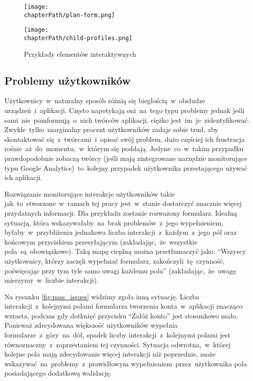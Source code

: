 \bigskip
\begin{figure}[H]
\centering
\begin{minipage}{.3\textwidth}
	\centering
	\texttt{[image: \\chapterPath/plan-form.png]}
\end{minipage}
\begin{minipage}{.4\textwidth}
	\centering
	\texttt{[image: \\chapterPath/child-profiles.png]}
\end{minipage}
\bigskip
\caption{Przykłady elementów interaktywnych}
\label{fig:interactive_areas}
\end{figure}

\subsection{Problemy użytkowników}
Użytkownicy~w~naturalny sposób różnią się biegłością~w~obsłudze urządzeń~i~aplikacji. Często napotykają oni~na~tego typu problemy jednak jeśli sami~nie~poinformują~o~nich twórców aplikacji, ciężko jest~im~je~zidentyfikować. Zwykle~tylko~marginalny procent użytkowników zadaje sobie trud, aby skontaktować się~z~twórcami~i~opisać swój problem, dużo częściej ich frustracja rośnie~aż~do~momentu,~w~którym się poddają. Jedyne~co~w~takim przypadku prawdopodobnie zobaczą twórcy (jeśli mają zintegrowane narzędzie monitorujące typu Google Analytics)~to~kolejny przypadek użytkownika przestającego używać ich aplikacji. 

Rozwiązanie monitorujące interakcje użytkowników takie jak~to~stworzone~w~ramach tej pracy jest~w~stanie dostarczyć znacznie więcej przydatnych informacji. Dla przykładu zostanie rozważony formularz. Idealną sytuacją, która wskazywałaby~na~brak problemów~z~jego wypełnieniem, byłaby~w~przybliżeniu jednakowa liczba interakcji~z~każdym~z~jego pól oraz końcowym przyciskiem przesyłającym (zakładając,~że~wszystkie pola~są~obowiązkowe). Taką mapę cieplną można przetłumaczyć jako: ``Wszyscy użytkownicy, którzy zaczęli wypełniać formularz, zakończyli~tę~czynność, poświęcając przy tym tyle samo uwagi każdemu polu'' (zakładając,~że~uwagę mierzymy~w~liczbie interakcji). 

Na rysunku \ref{fig:pass_issues} widzimy zgoła inną sytuację. Liczba interakcji~z~kolejnymi polami formularza tworzenia konta~w~aplikacji znacząco wzrasta, podczas gdy dotknięć przycisku ``Załóż konto'' jest stosunkowo mało. Ponieważ zdecydowana większość użytkowników wypełnia formularze~z~góry~na~dół, spadek liczby interakcji~z~kolejnymi polami jest równoznaczny~z~zaprzestaniem tej czynności. Sytuacja odwrotna,~w~której kolejne pola mają zdecydowanie więcej interakcji niż poprzednie, może wskazywać~na~problemy~z~prawidłowym wypełnieniem~przez~użytkownika pola posiadającego dodatkową walidację. 

